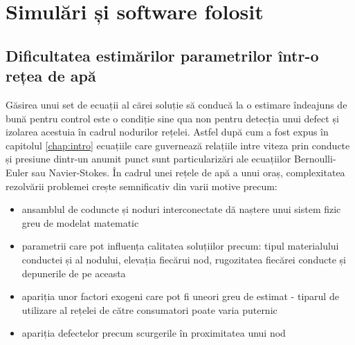 \chapter{Simulări și software folosit}
\label{chap:simulari}

\section{Dificultatea estimărilor parametrilor într-o rețea de apă}

Găsirea unui set de ecuații al cărei soluție să conducă la o estimare îndeajuns de bună pentru control este o condiție sine qua non pentru detecția unui defect și izolarea acestuia în cadrul nodurilor rețelei. Astfel după cum a fost expus în capitolul \ref{chap:intro} ecuațiile care guvernează relațiile intre viteza prin conducte și presiune dintr-un anumit punct sunt particularizări ale ecuațiilor Bernoulli-Euler sau Navier-Stokes. În cadrul unei rețele de apă a unui oraș, complexitatea rezolvării problemei crește semnificativ din varii motive precum:
\begin{itemize}
\item ansamblul de coduncte și noduri interconectate dă naștere unui sistem fizic greu de modelat matematic
\item parametrii care pot influența calitatea soluțiilor precum: tipul materialului conductei și al nodului, elevația fiecărui nod, rugozitatea fiecărei conducte și depunerile de pe aceasta
\item apariția unor factori exogeni care pot fi uneori greu de estimat - tiparul de utilizare al rețelei de către consumatori poate varia puternic
\item apariția defectelor precum scurgerile în proximitatea unui nod
\end{itemize}
